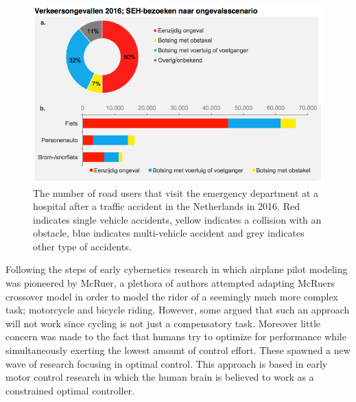 \begin{figure}[ht]
    \centering
    \includegraphics[scale=0.8]{images/figure1_1.png}
    \caption[Short title]{The number of road users that visit the emergency department at a hospital after a traffic accident in the Netherlands in 2016. Red indicates single vehicle accidents, yellow indicates a collision with an obstacle, blue indicates multi-vehicle accident and grey indicates other type of accidents\cite{krul_nijman_stam_2016}.}
    \label{fig:figure1}
\end{figure}

Following the steps of early cybernetics research in which airplane pilot modeling was pioneered by McRuer\cite{mcruer1959human,mcruer1967manual,mcruer1967manual2}, a plethora of authors attempted adapting McRuers crossover model in order to model the rider of a seemingly much more complex task; motorcycle and bicycle riding. However, some argued that such an approach will not work since cycling is not just a compensatory task. Moreover little concern was made to the fact that humans try to optimize for performance while simultaneously exerting the lowest amount of control effort. These spawned a new wave of research focusing in optimal control.  This approach is based in early motor control research in which the human brain is believed to work as a constrained optimal controller. 

